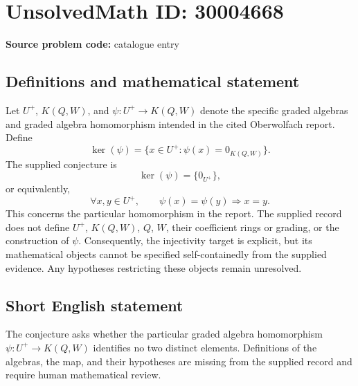 \documentclass[11pt]{article}
\begin{document}
\section*{UnsolvedMath ID: 30004668}
\textbf{Source problem code:} catalogue entry
\subsection{Definitions and mathematical statement}
Let \(U^+\), \(K(Q,W)\), and \(\psi:U^+\to K(Q,W)\) denote the specific graded algebras and graded algebra homomorphism intended in the cited Oberwolfach report. Define
\[
\ker(\psi)=\{x\in U^+:\psi(x)=0_{K(Q,W)}\}.
\]
The supplied conjecture is
\[
\ker(\psi)=\{0_{U^+}\},
\]
or equivalently,
\[
\forall x,y\in U^+,\qquad \psi(x)=\psi(y)\Longrightarrow x=y.
\]
This concerns the particular homomorphism in the report. The supplied record does not define \(U^+\), \(K(Q,W)\), \(Q\), \(W\), their coefficient rings or grading, or the construction of \(\psi\). Consequently, the injectivity target is explicit, but its mathematical objects cannot be specified self-containedly from the supplied evidence. Any hypotheses restricting these objects remain unresolved.
\subsection{Short English statement}
The conjecture asks whether the particular graded algebra homomorphism \(\psi:U^+\to K(Q,W)\) identifies no two distinct elements. Definitions of the algebras, the map, and their hypotheses are missing from the supplied record and require human mathematical review.
\end{document}
